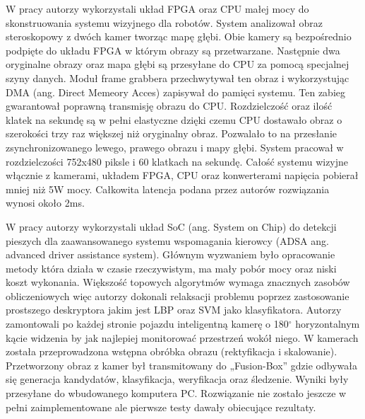 W pracy \cite{honegger2014real} autorzy wykorzystali układ FPGA oraz CPU małej mocy do skonstruowania systemu wizyjnego dla robotów. System analizował obraz steroskopowy z dwóch kamer tworząc mapę głębi. Obie kamery są bezpośrednio podpięte do układu FPGA w którym obrazy są przetwarzane. Następnie dwa oryginalne obrazy oraz mapa głębi są przesyłane do CPU za pomocą specjalnej szyny danych. Moduł frame grabbera przechwytywał ten obraz i wykorzystując DMA (ang. Direct Memeory Acces) zapisywał do pamięci systemu. Ten zabieg gwarantował poprawną transmisję obrazu do CPU. Rozdzielczość oraz ilość klatek na sekundę są w pełni elastyczne dzięki czemu CPU dostawało obraz o szerokości trzy raz większej niż oryginalny obraz. Pozwalało to na przesłanie zsynchronizowanego lewego, prawego obrazu i mapy głębi. System pracował w rozdzielczości 752x480 piksle i 60 klatkach na sekundę. Całość systemu wizyjne włącznie z kamerami, układem FPGA, CPU oraz konwerterami napięcia pobierał mniej niż 5W mocy. Całkowita latencja podana przez autorów rozwiązania wynosi około 2ms.

W pracy \cite{piao2016real} autorzy wykorzystali układ SoC (ang. System on Chip) do detekcji pieszych dla zaawansowanego systemu wspomagania kierowcy (ADSA ang. advanced driver assistance system). Głównym wyzwaniem było opracowanie metody która działa w czasie rzeczywistym, ma mały pobór mocy oraz niski koszt wykonania. Większość topowych algorytmów  wymaga znacznych zasobów obliczeniowych więc autorzy dokonali relaksacji problemu poprzez zastosowanie prostszego deskryptora jakim jest LBP oraz SVM jako klasyfikatora. Autorzy zamontowali po każdej stronie pojazdu inteligentną kamerę o 180$^\circ$ horyzontalnym kącie widzenia by jak najlepiej monitorować przestrzeń wokół niego. W kamerach została przeprowadzona wstępna obróbka obrazu (rektyfikacja i skalowanie). Przetworzony obraz z kamer był transmitowany do „Fusion-Box” gdzie odbywała się generacja kandydatów, klasyfikacja, weryfikacja oraz śledzenie. Wyniki były przesyłane do wbudowanego komputera PC. Rozwiązanie nie zostało jeszcze w pełni zaimplementowane ale pierwsze testy dawały obiecujące rezultaty.

